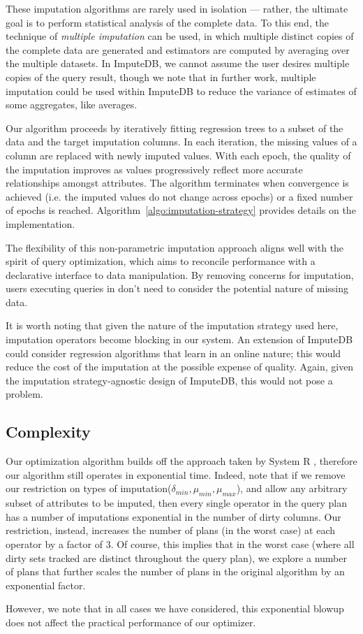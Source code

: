 These imputation algorithms are rarely used in isolation --- rather, the ultimate goal is to
perform statistical analysis of the complete data. To this end, the technique of
\textit{multiple imputation} can be used, in which multiple distinct copies of the complete
data are generated and estimators are computed by averaging over the multiple datasets. In
ImputeDB, we cannot assume the user desires multiple copies of the query result, though we
note that in further work, multiple imputation could be used within ImputeDB to reduce the
variance of estimates of some aggregates, like averages.

Our algorithm proceeds by iteratively fitting regression trees to a subset of the data and
the target imputation columns. In each iteration, the missing values of a column are
replaced with newly imputed values. With each epoch, the quality of the imputation improves
as values progressively reflect more accurate relationships amongst attributes. The
algorithm terminates when convergence is achieved (i.e. the imputed values do not change across
epochs) or a fixed number of epochs is reached.  Algorithm~\ref{algo:imputation-strategy}
provides details on the implementation.  

The flexibility of this non-parametric imputation approach aligns well with the spirit of
query optimization, which aims to reconcile performance with a declarative interface to data
manipulation. By removing concerns for imputation, users executing queries in \ProjectName{}
don't need to consider the potential nature of missing data.

It is worth noting that given the nature of the imputation strategy used here, imputation
operators become blocking in our system. An extension of ImputeDB could consider regression
algorithms that learn in an online nature; this would reduce the cost of the imputation at
the possible expense of quality. Again, given the imputation strategy-agnostic design of
ImputeDB, this would not pose a problem.

\begin{algorithm}
    
\end{algorithm}

\subsection{Complexity}
Our optimization algorithm builds off the approach taken by System R \cite{blasgen1981system}, therefore our algorithm still operates in exponential time. Indeed, 
note that if we remove our restriction on types of imputation($\delta_{min}, \mu_{min}, \mu_{max}$), and allow any arbitrary subset of attributes to be imputed,
then every single operator in the query plan has a number of imputations exponential in the number of dirty columns. Our restriction, instead, increases the number
of plans (in the worst case) at each operator by a factor of 3. Of course, this implies that in the worst case (where all dirty sets tracked are distinct throughout the query plan),
we explore a number of plans that further scales the number of plans in the original algorithm by an exponential factor.

However, we note that in all cases we have considered, this exponential blowup does not affect the practical performance of our optimizer.


